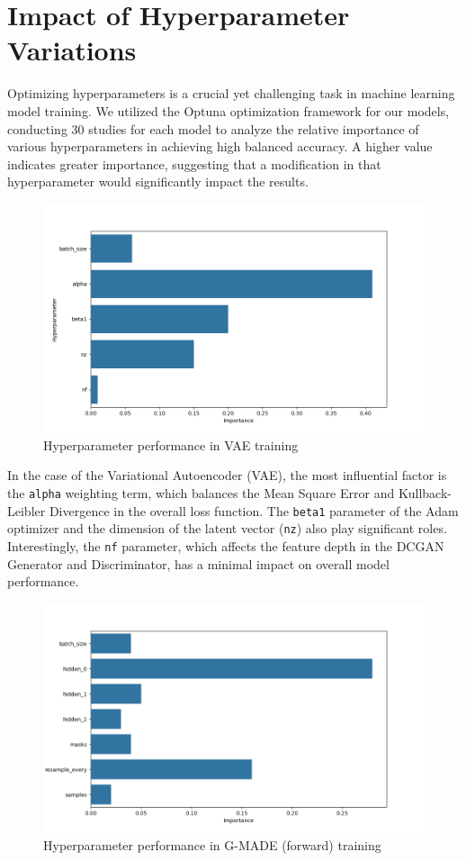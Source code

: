 \section{Impact of Hyperparameter Variations}
Optimizing hyperparameters is a crucial yet challenging task in machine learning model training. We utilized the Optuna optimization framework for our models, conducting 30 studies for each model to analyze the relative importance of various hyperparameters in achieving high balanced accuracy. A higher value indicates greater importance, suggesting that a modification in that hyperparameter would significantly impact the results.

\begin{figure}[h!]
    \includegraphics[width=\linewidth]{images/importances_vae}
    \caption{
    Hyperparameter performance in VAE training
}
\end{figure}

In the case of the Variational Autoencoder (VAE), the most influential factor is the \lstinline{alpha} weighting term, which balances the Mean Square Error and Kullback-Leibler Divergence in the overall loss function. The \lstinline{beta1} parameter of the Adam optimizer and the dimension of the latent vector (\lstinline{nz}) also play significant roles. Interestingly, the \lstinline{nf} parameter, which affects the feature depth in the DCGAN Generator and Discriminator, has a minimal impact on overall model performance.

\begin{figure}[h!]
    \includegraphics[width=\linewidth]{images/importances_gmade}
    \caption{
    Hyperparameter performance in G-MADE (forward) training
}
\end{figure}

